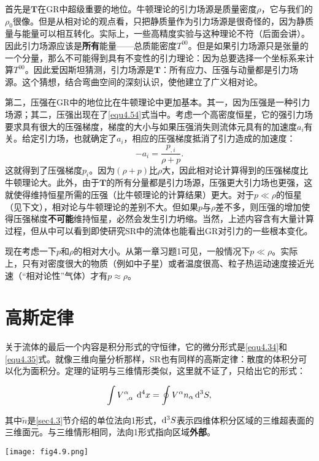 首先是$\mathbf{T}$在GR中超级重要的地位。牛顿理论的引力场源是质量密度$\rho$，它与我们的$\rho_0$很像。但是从相对论的观点看，只把静质量作为引力场源是很奇怪的，因为静质量与能量可以相互转化。实际上，一些高精度实验与这种理论不符（后面会讲）。因此引力场源应该是\textbf{所有}能量——总质能密度$T^{00}$。但是如果引力场源只是张量的一个分量，那么不可能得到具有不变性的引力理论：因为总要选择一个坐标系来计算$T^{00}$。因此爱因斯坦猜测，引力场源是$\mathbf{T}$：所有应力、压强与动量都是引力场源。这个猜想，结合弯曲空间的深刻认识，使他建立了广义相对论。

第二，压强在GR中的地位比在牛顿理论中更加基本。其一，因为压强是一种引力场源；其二，压强出现在了\eqref{equ4.54}式当中。考虑一个高密度恒星，它的强引力场要求具有很大的压强梯度，梯度的大小与如果压强消失则流体元具有的加速度$a_i$有关。给定引力场，也就确定了$a_i$，相应的压强梯度抵消了引力造成的加速度：
\[
    -a_i = \frac{p_{,i}}{\rho + p}.
\]
这就得到了压强梯度$p_i$。因为$(\rho + p)$比$\rho$大，因此相对论计算得到的压强梯度比牛顿理论大。此外，由于$\mathbf{T}$的所有分量都是引力场源，压强更大引力场也更强，这就使得维持恒星所需的压强（比牛顿理论的计算结果）更大。对于$p \ll \rho$的恒星（见下文），相对论与牛顿理论的差别不大。但如果$p$与$\rho$差不多，则压强的增加使得压强梯度\textbf{不可能}维持恒星，必然会发生引力坍缩。当然，上述内容含有大量计算过程，但从中可以看到即使研究SR中的流体也能看出GR对引力的一些根本变化。

现在考虑一下$p$和$\rho$的相对大小。从第一章习题1可见，一般情况下$p \ll \rho$。实际上，只有对密度很大的物质（例如中子星）或者温度很高、粒子热运动速度接近光速（“相对论性”气体）才有$p \approx \rho$。

\section{高斯定律}
\label{sec4.8}
关于流体的最后一个内容是积分形式的守恒律，它的微分形式是\eqref{equ4.34}和\eqref{equ4.35}式。就像三维向量分析那样，SR也有同样的高斯定律：散度的体积分可以化为面积分。定理的证明与三维情形类似，这里就不证了，只给出它的形式：
\begin{shaded}
\begin{equation}
    \int V\indices{^\alpha_{, \alpha}} \, \rd^4 x = \oint V^\alpha n_\alpha \,\rd^3 S,
\label{equ4.57}
\end{equation}
\end{shaded}
其中$\tilde{n}$是\ref{sec4.3}节介绍的单位法向1形式，$\mathrm{d}^3 S$表示四维体积分区域的三维超表面的三维面元。与三维情形相同，法向1形式指向区域\textbf{外部}。

{
    \centering
    \texttt{[image: fig4.9.png]}
    \label{fig4.9}
}

